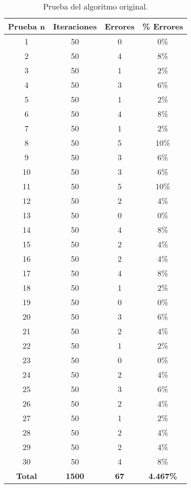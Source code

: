 \begin{table}
\centering
\footnotesize
\begin{tabular}{|c|c|c|c|}\hline
\textbf{Prueba} $\bf{n}$ & \textbf{Iteraciones} & \textbf{Errores} &
\textbf{\% Errores} \\\hline\hline
1 &  50 &   0 & 0\% \\\hline
2 &  50 &   4 & 8\% \\\hline
3 &  50 &   1 & 2\% \\\hline
4 &  50 &   3 & 6\% \\\hline
5 &  50 &   1 & 2\% \\\hline
6 &  50 &   4 & 8\% \\\hline
7 &  50 &   1 & 2\% \\\hline
8 &  50 &   5 & 10\% \\\hline
9 &  50 &   3 & 6\% \\\hline
10 &  50 &   3 & 6\% \\\hline
11 &  50 &   5 & 10\% \\\hline
12 &  50 &   2 & 4\% \\\hline
13 &  50 &   0 & 0\% \\\hline
14 &  50 &   4 & 8\% \\\hline
15 &  50 &   2 & 4\% \\\hline
16 &  50 &   2 & 4\% \\\hline
17 &  50 &   4 & 8\% \\\hline
18 &  50 &   1 & 2\% \\\hline
19 &  50 &   0 & 0\% \\\hline
20 &  50 &   3 & 6\% \\\hline
21 &  50 &   2 & 4\% \\\hline
22 &  50 &   1 & 2\% \\\hline
23 &  50 &   0 & 0\% \\\hline
24 &  50 &   2 & 4\% \\\hline
25 &  50 &   3 & 6\% \\\hline
26 &  50 &   2 & 4\% \\\hline
27 &  50 &   1 & 2\% \\\hline
28 &  50 &   2 & 4\% \\\hline
29 &  50 &   2 & 4\% \\\hline
30 &  50 &   4 & 8\% \\\hline\hline
\textbf{Total} &  \textbf{1500} &  \textbf{67} & \textbf{4.467\%} \\\hline
\end{tabular}
\caption{Prueba del algoritmo original.}
\label{cua:resultados_script}
\end{table}

